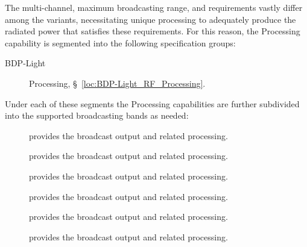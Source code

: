 The multi-channel, maximum broadcasting range, and \SWaP requirements vastly differ among the \ThisSys variants, necessitating unique \RF processing to adequately produce the radiated \RF power that satisfies these requirements. For this reason, the \ThisSys \RF Processing capability is segmented into the following specification groups:

\begin{description}
	\item[BDP-Light] \RF Processing, \S~\ref{loc:BDP-Light_RF_Processing}.
\end{description}

Under each of these segments the \ThisSys \RF Processing capabilities are further subdivided into the supported broadcasting bands as needed:

\begin{description}
	\item[\AM]        provides the \AM        broadcast output and related \RF processing.%
	\item[\SW]        provides the \SW        broadcast output and related \RF processing.%
	\item[\FM]        provides the \FM        broadcast output and related \RF processing.%
	\item[\TVVHFLow]  provides the \TVVHFLow  broadcast output and related \RF processing.%
	\item[\TVVHFHigh] provides the \TVVHFHigh broadcast output and related \RF processing.%
	\item[\TVUHF]     provides the \TVUHF     broadcast output and related \RF processing.%
\end{description}


\KNEADSUBSUBSECTIONNEWPAGE
